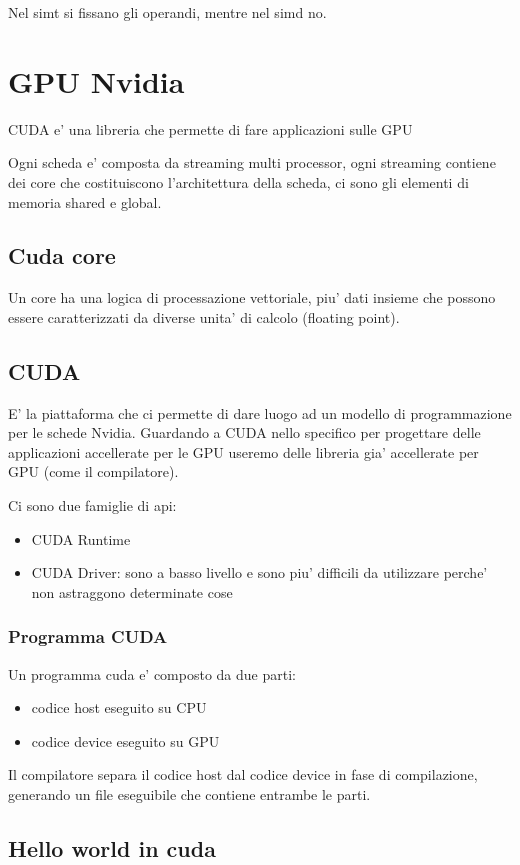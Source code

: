 Nel simt si fissano gli operandi, mentre nel simd no.

\section{GPU Nvidia}
CUDA e' una libreria che permette di fare applicazioni sulle GPU

Ogni scheda e' composta da streaming multi processor, ogni streaming contiene dei core che costituiscono l'architettura della scheda, ci sono gli elementi di memoria shared e global.

\subsection{Cuda core}
Un core ha una logica di processazione vettoriale, piu' dati insieme che possono essere caratterizzati da diverse unita' di calcolo (floating point).

\subsection{CUDA}
E' la piattaforma che ci permette di dare luogo ad un modello di programmazione per le schede Nvidia.
Guardando a CUDA nello specifico per progettare delle applicazioni accellerate per le GPU useremo delle libreria gia' accellerate per GPU (come il compilatore).

Ci sono due famiglie di api:
\begin{itemize}
    \item CUDA Runtime
    \item CUDA Driver: sono a basso livello e sono piu' difficili da utilizzare perche' non astraggono determinate cose
\end{itemize}

\subsubsection{Programma CUDA}
Un programma cuda e' composto da due parti:
\begin{itemize}
    \item codice host eseguito su CPU
    \item codice device eseguito su GPU
\end{itemize}

Il compilatore separa il codice host dal codice device in fase di compilazione, generando un file eseguibile che contiene entrambe le parti.

\subsection{Hello world in cuda}

